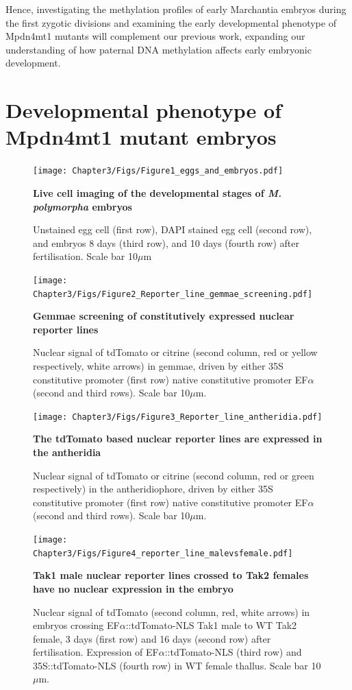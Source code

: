 Hence, investigating the methylation profiles of early Marchantia embryos during the first zygotic divisions and examining the early developmental phenotype of Mpdn4mt1 mutants will complement our previous work, expanding our understanding of how paternal DNA methylation affects early embryonic development.

\section{Developmental phenotype of Mpdn4mt1 mutant embryos}

\begin{figure}[htbp!] 
\centering    
    \texttt{[image: Chapter3/Figs/Figure1\_eggs\_and\_embryos.pdf]}
\caption{\textbf{Live cell imaging of the developmental stages of \textit{M. polymorpha} embryos}}
\label{fig:egg_embryo}
\captionsetup{font=small}
    \caption*{Unstained egg cell (first row), DAPI stained egg cell (second row), and embryos 8 days (third row), and 10 days (fourth row) after fertilisation. Scale bar 10$\mu$m}
\end{figure}

\begin{figure}[htbp!] 
\centering    
    \texttt{[image: Chapter3/Figs/Figure2\_Reporter\_line\_gemmae\_screening.pdf]}
\caption{\textbf{Gemmae screening of constitutively expressed nuclear reporter lines}}
\label{fig:gemma:screen}
\captionsetup{font=small}
    \caption*{Nuclear signal of tdTomato or citrine (second column, red or yellow respectively, white arrows) in gemmae, driven by either 35S constitutive promoter (first row) native constitutive promoter EF$\alpha$ (second and third rows). Scale bar 10$\mu$m.}
\end{figure}

\begin{figure}[htbp!] 
\centering    
    \texttt{[image: Chapter3/Figs/Figure3\_Reporter\_line\_antheridia.pdf]}
\caption{\textbf{The tdTomato based nuclear reporter lines are expressed in the antheridia}}
\label{fig:antheridia_screen}
\captionsetup{font=small}
    \caption*{Nuclear signal of tdTomato or citrine (second column, red or green respectively) in the antheridiophore, driven by either 35S constitutive promoter (first row) native constitutive promoter EF$\alpha$ (second and third rows). Scale bar 10$\mu$m.}
\end{figure}

\begin{figure}[htbp!] 
\centering    
    \texttt{[image: Chapter3/Figs/Figure4\_reporter\_line\_malevsfemale.pdf]}
\caption{\textbf{Tak1 male nuclear reporter lines crossed to Tak2 females have no nuclear expression in the embryo}}
\label{fig:malevsfemale}
\captionsetup{font=small}
    \caption*{Nuclear signal of tdTomato (second column, red, white arrows) in embryos crossing EF$\alpha$::tdTomato-NLS Tak1 male to WT Tak2 female, 3 days (first row) and 16 days (second row) after fertilisation. Expression of EF$\alpha$::tdTomato-NLS (third row) and  35S::tdTomato-NLS (fourth row) in WT female thallus. Scale bar 10$\mu$m.}
\end{figure}

